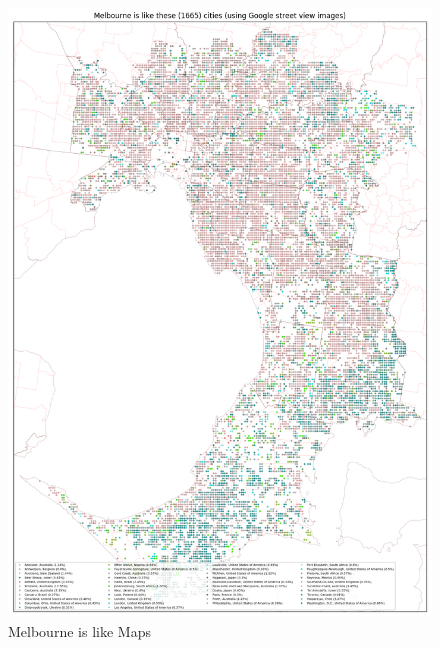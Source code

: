 \documentclass[sageh,times]{sagej}
\begin{document}
\begin{figure}[!htbp]
\includegraphics[scale=0.20]{Images/MelbourneOverallAbrev_maps.png} 
\caption{Melbourne is like Maps}    
 \label{fig:melmaps}  
\end{figure} 
\end{document}
